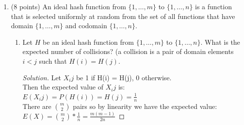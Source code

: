 \documentclass[10pt,letterpaper,unboxed,cm]{article}
\newenvironment{solution}
  {\begin{proof}[Solution]}
  {\end{proof}}
\begin{document}
\begin{enumerate}
\begin{enumerate}
\begin{solution}
\end{solution}

\item
What is the expected number of coin flips until you get a HHH?

(You can use a similar strategy for this problem)

\begin{solution}
    For this case the expected value is as follows:\\
    \(E(X) = \frac{1}{2}*E(X|T) + \frac{1}{4}*E(X|HT) + \frac{1}{8}*E(X|HHT) + \frac{1}{8}*E(X||HHH)\)\\
    \(E(X) = \frac{1}{2}(1 + E(X)) + \frac{1}{4}(2 + E(X)) + \frac{1}{8}(3 + E(X)) + \frac{1}{8}*3\)\\
    \(E(X) = \frac{E(X)}{2} + \frac{E(X)}{4} + \frac{E(X)}{8} + \frac{1}{2} + \frac{1}{2} + \frac{3}{8} + \frac{3}{8}\)\\
    \(\frac{E(X)}{8} = \frac{14}{8} \rightarrow \boxed{E(X) = 14}\)\\
    Again, we are just applying the same principle as in part a.
\end{solution}

\end{enumerate}

\item (8 points)
An ideal hash function from $\{1,\dots, m\}$ to $\{1,\dots, n\}$ is a function that is selected uniformly at random from the set of all functions that have domain $\{1,\dots, m\}$ and codomain $\{1,\dots, n\}$.

\begin{enumerate}
\item
Let $H$ be an ideal hash function from $\{1,\dots, m\}$ to $\{1,\dots, n\}$. What is the expected number of collisions? (a collision is a pair of domain elements $i<j$ such that $H(i) = H(j)$.

\begin{solution}
    
    Let $X_ij$ be 1 if H(i) = H(j), 0 otherwise.\\
    Then the expected value of $X_ij$ is:\\
    \(E(X_ij) = P(H(i)) = H(j) = \frac{1}{n}\)\\
    There are $\binom{m}{2}$ pairs so by linearity we have the expected value:\\
    \(E(X) = \binom{m}{2} * \frac{1}{n} = \boxed{\frac{m(m-1)}{2n}}\)
    
\end{solution}


\end{enumerate}
\end{enumerate}
\end{document}
